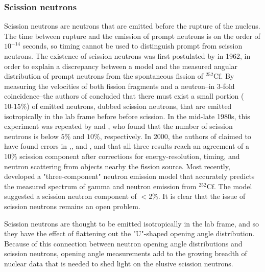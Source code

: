 \subsubsection{Scission neutrons} 
Scission neutrons are neutrons that are emitted before the rupture of the nucleus. The time between rupture and the emission of prompt neutrons is on the order of $10^{-14}$ seconds, so timing cannot be used to distinguish prompt from scission neutrons. The existence of scission neutrons was first postulated by \cite{Bowman} in 1962, in order to explain a discrepancy between a model and the measured angular distribution of prompt neutrons from the spontaneous fission of $^{252}\text{Cf}$. By measuring the velocities of both fission fragments and a neutron--in 3-fold coincidence--the authors of \cite{Bowman} concluded that there must exist a small portion ($\text{10-15\%}$) of emitted neutrons, dubbed scission neutrons, that are emitted isotropically in the lab frame before before scission. In the mid-late 1980s, this experiment was repeated by \cite{seregina1985} and \cite{JORGENSEN}, who found that the number of scission neutrons is below $5\%$ and $10\%$, respectively. In 2000, the authors of \cite{KORNILOV2001} claimed to have found errors in \cite{Bowman},\cite{JORGENSEN}, and \cite{seregina1985}, and that all three results reach an agreement of a $10\%$ scission component after corrections for energy-resolution, timing, and neutron scattering from objects nearby the fission source. Most recently, \cite{serot2017influence} developed a "three-component" neutron emission model that accurately predicts the measured spectrum of gamma and neutron emission from $^{252}\text{Cf}$. The model suggested a scission neutron component of $<$2\%. It is clear that the issue of scission neutrons remains an open problem. 

Scission neutrons are thought to be emitted isotropically in the lab frame, and so they have the effect of flattening out the "U"-shaped opening angle distribution. Because of this connection between neutron opening angle distributions and scission neutrons, opening angle measurements add to the growing breadth of nuclear data that is needed to shed light on the elusive scission neutrons.

